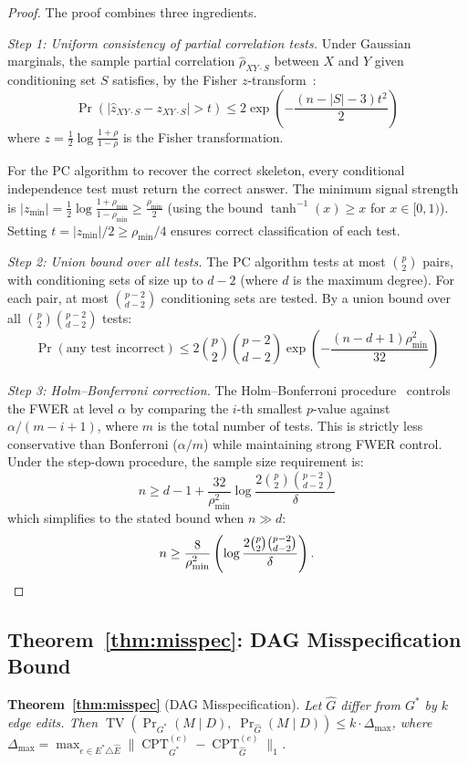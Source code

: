 \documentclass[11pt]{article}
\DeclareMathOperator{\TV}{TV}
\DeclareMathOperator{\Pr}{Pr}
\DeclareMathOperator{\CPT}{CPT}
\begin{document}
\begin{proof}
The proof combines three ingredients.

\emph{Step 1: Uniform consistency of partial correlation tests.}
Under Gaussian marginals, the sample partial correlation $\hat{\rho}_{XY \cdot S}$ between $X$ and $Y$ given conditioning set $S$ satisfies, by the Fisher $z$-transform~\cite{uhler2013}:
\[
  \Pr\!\left(|\hat{z}_{XY \cdot S} - z_{XY \cdot S}| > t\right) \leq 2\exp\!\left(-\frac{(n - |S| - 3)t^2}{2}\right)
\]
where $z = \frac{1}{2}\log\frac{1+\rho}{1-\rho}$ is the Fisher transformation.

For the PC algorithm to recover the correct skeleton, every conditional independence test must return the correct answer.
The minimum signal strength is $|z_{\min}| = \frac{1}{2}\log\frac{1+\rho_{\min}}{1-\rho_{\min}} \geq \frac{\rho_{\min}}{2}$ (using the bound $\tanh^{-1}(x) \geq x$ for $x \in [0,1)$).
Setting $t = |z_{\min}|/2 \geq \rho_{\min}/4$ ensures correct classification of each test.

\emph{Step 2: Union bound over all tests.}
The PC algorithm tests at most $\binom{p}{2}$ pairs, with conditioning sets of size up to $d-2$ (where $d$ is the maximum degree).
For each pair, at most $\binom{p-2}{d-2}$ conditioning sets are tested.
By a union bound over all $\binom{p}{2}\binom{p-2}{d-2}$ tests:
\[
  \Pr(\text{any test incorrect}) \leq 2\binom{p}{2}\binom{p-2}{d-2} \exp\!\left(-\frac{(n - d + 1)\rho_{\min}^2}{32}\right)
\]

\emph{Step 3: Holm--Bonferroni correction.}
The Holm--Bonferroni procedure~\cite{holm1979} controls the FWER at level $\alpha$ by comparing the $i$-th smallest $p$-value against $\alpha/(m - i + 1)$, where $m$ is the total number of tests.
This is strictly less conservative than Bonferroni ($\alpha/m$) while maintaining strong FWER control.
Under the step-down procedure, the sample size requirement is:
\[
  n \geq d - 1 + \frac{32}{\rho_{\min}^2}\log\frac{2\binom{p}{2}\binom{p-2}{d-2}}{\delta}
\]
which simplifies to the stated bound when $n \gg d$:
\[
  n \geq \frac{8}{\rho_{\min}^2}\left(\log\frac{2\binom{p}{2}\binom{p-2}{d-2}}{\delta}\right). \qedhere
\]
\end{proof}

\subsection{Theorem~\ref{thm:misspec}: DAG Misspecification Bound}

\noindent\textbf{Theorem~\ref{thm:misspec}} (DAG Misspecification).
\textit{Let $\hat{G}$ differ from $G^*$ by $k$ edge edits.
Then $\TV\!\left(\Pr_{G^*}(M \mid D),\; \Pr_{\hat{G}}(M \mid D)\right) \leq k \cdot \Delta_{\max}$,
where $\Delta_{\max} = \max_{e \in E^* \triangle \hat{E}} \|\CPT_{G^*}^{(e)} - \CPT_{\hat{G}}^{(e)}\|_1$.}
\end{document}
